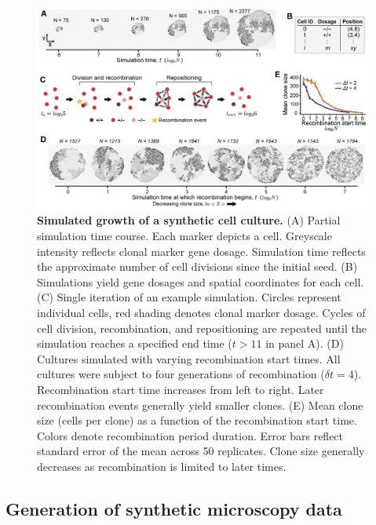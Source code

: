 \begin{figure}[h]
\includegraphics[width=1.0\columnwidth]{./figure_S6}
\caption[Simulated growth of a synthetic cell culture.]{\textbf{Simulated growth of a synthetic cell culture.} (A) Partial simulation time course. Each marker depicts a cell. Greyscale intensity reflects clonal marker gene dosage. Simulation time reflects the approximate number of cell divisions since the initial seed. (B) Simulations yield gene dosages and spatial coordinates for each cell. (C) Single iteration of an example simulation. Circles represent individual cells, red shading denotes clonal marker dosage. Cycles of cell division, recombination, and repositioning are repeated until the simulation reaches a specified end time ($t>11$ in panel A). (D) Cultures simulated with varying recombination start times. All cultures were subject to four generations of recombination ($\delta t=4$). Recombination start time increases from left to right. Later recombination events generally yield smaller clones. (E) Mean clone size (cells per clone) as a function of the recombination start time. Colors denote recombination period duration. Error bars reflect standard error of the mean across 50 replicates. Clone size generally decreases as recombination is limited to later times.}
\label{fig:figS6}
\end{figure}


\subsection{Generation of synthetic microscopy data}

